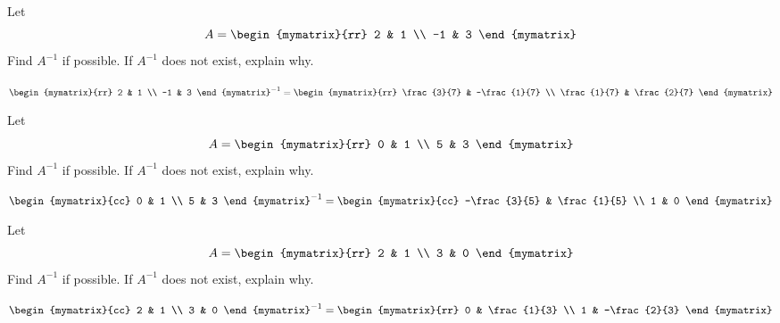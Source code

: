 \begin{enumialphparenastyle}

\begin{ex} Let
\begin{equation*}
A=\begin{mymatrix}{rr}
2 & 1 \\
-1 & 3
\end{mymatrix} 
\end{equation*}
Find $A^{-1}$ if possible. If $A^{-1}$ does not exist, explain why. 
\begin{sol}
$\def\arraystretch{1.2}
\begin{mymatrix}{rr}
2 & 1 \\
-1 & 3
\end{mymatrix}^{-1}= \begin{mymatrix}{rr}
\frac{3}{7} & -\frac{1}{7} \\
\frac{1}{7} & \frac{2}{7}
\end{mymatrix}$
\end{sol}
\end{ex}

\begin{ex}Let
\begin{equation*}
A=\begin{mymatrix}{rr}
0 & 1 \\
5 & 3
\end{mymatrix} 
\end{equation*}
Find $A^{-1}$ if possible. If $A^{-1}$ does not exist, explain why. 
\begin{sol}
$\def\arraystretch{1.2}
\begin{mymatrix}{cc}
0 & 1 \\
5 & 3
\end{mymatrix}^{-1}= \begin{mymatrix}{cc}
-\frac{3}{5} & \frac{1}{5} \\
1 & 0
\end{mymatrix}$
\end{sol}
\end{ex}

\begin{ex}Let
\begin{equation*}
A=\begin{mymatrix}{rr}
2 & 1 \\
3 & 0
\end{mymatrix} 
\end{equation*}
Find $A^{-1}$ if possible. If $A^{-1}$ does not exist, explain why.
\begin{sol}
$\def\arraystretch{1.2}
\begin{mymatrix}{cc}
2 & 1 \\
3 & 0
\end{mymatrix}^{-1}= \begin{mymatrix}{rr}
0 & \frac{1}{3} \\
1 & -\frac{2}{3}
\end{mymatrix}$
\end{sol}
\end{ex}


\end{enumialphparenastyle}
